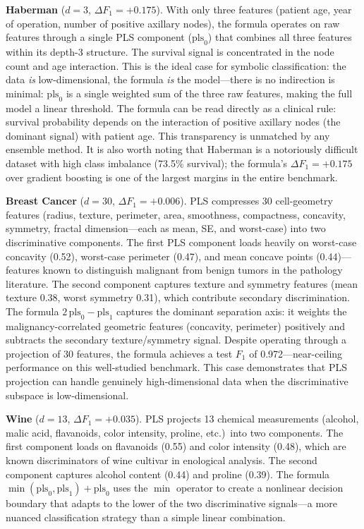 \documentclass[journal]{IEEEtran}
\begin{document}
\textbf{Haberman} ($d = 3$, $\Delta F_1 = +0.175$).
With only three features (patient age, year of operation, number of
positive axillary nodes), the formula operates on raw features
through a single PLS component ($\mathrm{pls}_0$) that combines all
three features within its depth-3 structure.  The survival signal
is concentrated in the node count and age interaction.  This is the
ideal case for symbolic classification: the data \emph{is}
low-dimensional, the formula \emph{is} the model---there is no
indirection is minimal: $\mathrm{pls}_0$ is a single weighted sum of the three raw features, making the full model a linear threshold.  The
formula can be read directly as a clinical rule: survival
probability depends on the interaction of positive axillary nodes
(the dominant signal) with patient age.  This transparency is
unmatched by any ensemble method.  It is also worth noting that
Haberman is a notoriously difficult dataset with high class
imbalance (73.5\% survival); the formula's $\Delta F_1 = +0.175$
over gradient boosting is one of the largest margins in the entire
benchmark.

\textbf{Breast Cancer} ($d = 30$, $\Delta F_1 = +0.006$).
PLS compresses 30 cell-geometry features (radius, texture,
perimeter, area, smoothness, compactness, concavity, symmetry,
fractal dimension---each as mean, SE, and worst-case) into two
discriminative components.  The first PLS component loads heavily on
worst-case concavity (0.52), worst-case perimeter (0.47), and mean
concave points (0.44)---features known to distinguish malignant from
benign tumors in the pathology literature.  The second component
captures texture and symmetry features (mean texture 0.38, worst
symmetry 0.31), which contribute secondary discrimination.
The formula $2\,\mathrm{pls}_0 - \mathrm{pls}_1$ captures the
dominant separation axis: it weights the malignancy-correlated
geometric features (concavity, perimeter) positively and subtracts
the secondary texture/symmetry signal.  Despite operating through a
projection of 30 features, the formula achieves a test $F_1$ of
0.972---near-ceiling performance on this well-studied benchmark.
This case demonstrates that PLS projection can handle genuinely
high-dimensional data when the discriminative subspace is
low-dimensional.

\textbf{Wine} ($d = 13$, $\Delta F_1 = +0.035$).
PLS projects 13 chemical measurements (alcohol, malic acid,
flavanoids, color intensity, proline, etc.)\ into two components.
The first component loads on flavanoids (0.55) and color intensity
(0.48), which are known discriminators of wine cultivar in
enological analysis.  The second component captures alcohol content
(0.44) and proline (0.39).  The formula
$\min(\mathrm{pls}_0, \mathrm{pls}_1) + \mathrm{pls}_0$ uses the
$\min$ operator to create a nonlinear decision boundary that adapts
to the lower of the two discriminative signals---a more nuanced
classification strategy than a simple linear combination.
\end{document}

